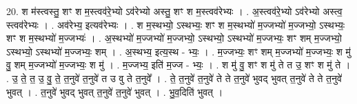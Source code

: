 \documentclass[17pt]{extarticle}
\begin{document}
20. श म॑स्त्वस्तु॒ शꣳ श म॒स्त्वव॑रे॒भ्यो ऽव॑रेभ्यो अस्तु॒ शꣳ श म॒स्त्वव॑रेभ्यः । . अ॒स्त्वव॑रे॒भ्यो ऽव॑रेभ्यो अस्त्व॒ स्त्वव॑रेभ्यः । . अव॑रेभ्य॒ इत्यव॑रेभ्यः । . श म॒स्थभ्यो॒ ऽस्थभ्यः॒ शꣳ श म॒स्थभ्यो॑ म॒ज्जभ्यो॑ म॒ज्जभ्यो॒ ऽस्थभ्यः॒ शꣳ श म॒स्थभ्यो॑ म॒ज्जभ्यः॑ । . अ॒स्थभ्यो॑ म॒ज्जभ्यो॑ म॒ज्जभ्यो॒ ऽस्थभ्यो॒ ऽस्थभ्यो॑ म॒ज्जभ्यः॒ शꣳ शम् म॒ज्जभ्यो॒ ऽस्थभ्यो॒ ऽस्थभ्यो॑ म॒ज्जभ्यः॒ शम् । . अ॒स्थभ्य॒ इत्य॒स्थ - भ्यः॒ । . म॒ज्जभ्यः॒ शꣳ शम् म॒ज्जभ्यो॑ म॒ज्जभ्यः॒ श मु॑ वु॒ शम् म॒ज्जभ्यो॑ म॒ज्जभ्यः॒ श मु॑ । . म॒ज्जभ्य॒ इति॑ म॒ज्ज - भ्यः॒ । . श मु॑ वु॒ शꣳ श मु॑ ते त उ॒ शꣳ श मु॑ ते । . उ॒ ते॒ त॒ उ॒ वु॒ ते॒ त॒नुवे॑ त॒नुवे॑ त उ वु ते त॒नुवे᳚ । . ते॒ त॒नुवे॑ त॒नुवे॑ ते ते त॒नुवे॑ भुवद् भुवत् त॒नुवे॑ ते ते त॒नुवे॑ भुवत् । . त॒नुवे॑ भुवद् भुवत् त॒नुवे॑ त॒नुवे॑ भुवत् । . भु॒व॒दिति॑ भुवत् । \newline
\pagebreak
\end{document}
